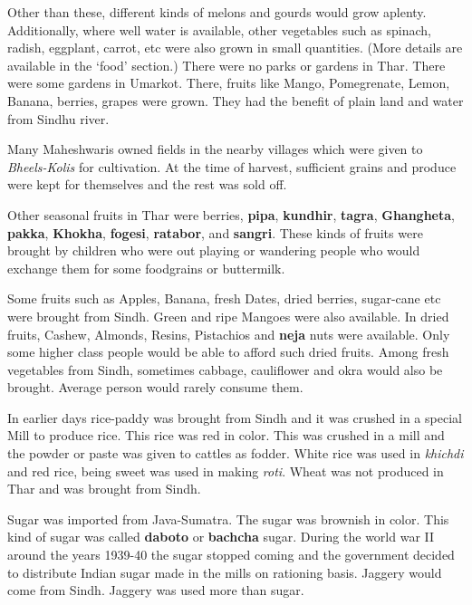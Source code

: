 Other than these, different kinds of melons and gourds would grow aplenty.
Additionally, where well water is available, other vegetables such as spinach,
radish, eggplant, carrot, etc were also grown in small quantities. (More
details are available in the `food' section.) There were no parks or gardens in
Thar. There were some gardens in Umarkot. There, fruits like Mango,
Pomegrenate, Lemon, Banana, berries, grapes were grown. They had the benefit of
plain land and water from Sindhu river.

Many Maheshwaris owned fields in the nearby villages which were given to
\textit{Bheels-Kolis} for cultivation. At the time of harvest, sufficient
grains and produce were kept for themselves and the rest was sold off. 

Other seasonal fruits in Thar were berries, \textbf{pipa}, \textbf{kundhir},
\textbf{tagra}, \textbf{Ghangheta}, \textbf{pakka}, \textbf{Khokha},
\textbf{fogesi}, \textbf{ratabor}, and \textbf{sangri}. These kinds of fruits
were brought by children who were out playing or wandering people who would
exchange them for some foodgrains or buttermilk.

Some fruits such as Apples, Banana, fresh Dates, dried berries, sugar-cane etc
were brought from Sindh. Green and ripe Mangoes were also available. In dried
fruits, Cashew, Almonds, Resins, Pistachios and \textbf{neja} nuts were
available. Only some higher class people would be able to afford such dried
fruits. Among fresh vegetables from Sindh, sometimes cabbage, cauliflower and
okra would also be brought. Average person would rarely consume them.

In earlier days rice-paddy was brought from Sindh and it was crushed in a
special Mill to produce rice. This rice was red in color. This was crushed in a
mill and the powder or paste was given to cattles as fodder. White rice was
used in \textit{khichdi} and red rice, being sweet was used in making
\textit{roti}. Wheat was not produced in Thar and was brought from Sindh. 

Sugar was imported from Java-Sumatra. The sugar was brownish in color. This
kind of sugar was called \textbf{daboto} or \textbf{bachcha} sugar. During the
world war II around the years 1939-40 the sugar stopped coming and the
government decided to distribute Indian sugar made in the mills on rationing
basis. Jaggery would come from Sindh. Jaggery was used more than sugar.

